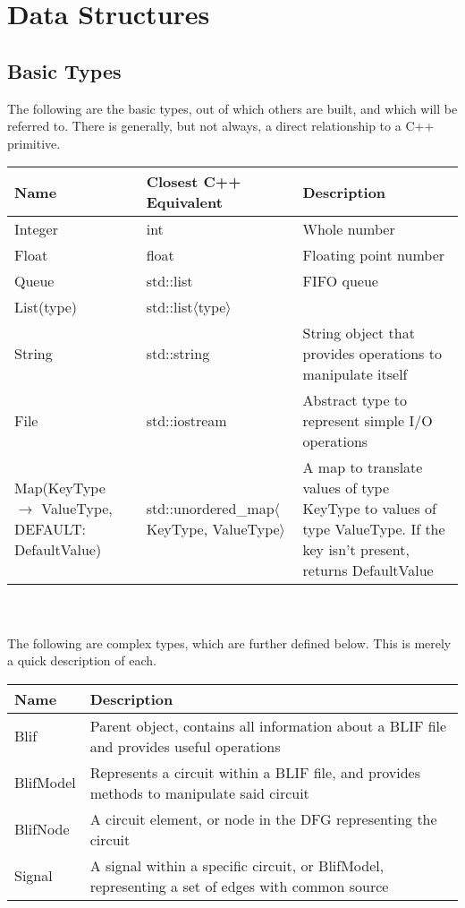 \documentclass[12pt,draft,oneside]{article} %
\begin{document}
\section{Data Structures}
\subsection{Basic Types}
The following are the basic types, out of which others are built, and which will be referred to. There is generally, but not always, a direct relationship to a C++ primitive.
\\
        \begin{tabularx}{\linewidth}{XXX}
        \toprule
        Name & Closest C++ Equivalent & Description\\
        \midrule
        Integer &  int & Whole number \\
        Float & float & Floating point number \\
        Queue & std::list & FIFO queue \\
        List(type) & std::list$\langle$type$\rangle$ &\\
        String & std::string & String object that provides operations to manipulate itself \\
        File & std::iostream & Abstract type to represent simple I/O operations \\
        Map(KeyType $\to$ ValueType, DEFAULT:  DefaultValue) & std::unordered\_map$\langle$KeyType, ValueType$\rangle$ & A map to translate values of type KeyType to values of type ValueType. If the key isn't present, returns DefaultValue \\
        \bottomrule
        \end{tabularx}
\\
\\
The following are complex types, which are further defined below. This is merely a quick description of each.
\\
        \begin{tabularx}{\linewidth}{lX}
        \toprule
        Name & Description\\
        \midrule
        Blif & Parent object, contains all information about a BLIF file and provides useful operations \\
        BlifModel & Represents a circuit within a BLIF file, and provides methods to manipulate said circuit \\
        BlifNode & A circuit element, or node in the DFG representing the circuit \\
        Signal & A signal within a specific circuit, or BlifModel, representing a set of edges with common source \\
        \bottomrule
        \end{tabularx}
\end{document}
